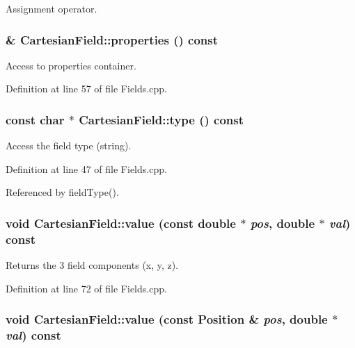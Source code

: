 Assignment operator. \hypertarget{class_d_d4hep_1_1_geometry_1_1_cartesian_field_ac6bf85a9043a7c08f84ce30afacc4b61}{
\subsubsection[{properties}]{ \& CartesianField::properties () const}}
\label{class_d_d4hep_1_1_geometry_1_1_cartesian_field_ac6bf85a9043a7c08f84ce30afacc4b61}


Access to properties container. 

Definition at line 57 of file Fields.cpp.\hypertarget{class_d_d4hep_1_1_geometry_1_1_cartesian_field_a9d06918823238356e8a1786391af78cc}{
\subsubsection[{type}]{\setlength{\rightskip}{0pt plus 5cm}const char $\ast$ CartesianField::type () const}}
\label{class_d_d4hep_1_1_geometry_1_1_cartesian_field_a9d06918823238356e8a1786391af78cc}


Access the field type (string). 

Definition at line 47 of file Fields.cpp.

Referenced by fieldType().\hypertarget{class_d_d4hep_1_1_geometry_1_1_cartesian_field_afb9f7d4d28e90f2e341e8272c718c604}{
\subsubsection[{value}]{\setlength{\rightskip}{0pt plus 5cm}void CartesianField::value (const double $\ast$ {\em pos}, \/  double $\ast$ {\em val}) const}}
\label{class_d_d4hep_1_1_geometry_1_1_cartesian_field_afb9f7d4d28e90f2e341e8272c718c604}


Returns the 3 field components (x, y, z). 

Definition at line 72 of file Fields.cpp.\hypertarget{class_d_d4hep_1_1_geometry_1_1_cartesian_field_a21a1a039c5a742fb3f62932059f7d1a7}{
\subsubsection[{value}]{\setlength{\rightskip}{0pt plus 5cm}void CartesianField::value (const {\bf Position} \& {\em pos}, \/  double $\ast$ {\em val}) const}}
\label{class_d_d4hep_1_1_geometry_1_1_cartesian_field_a21a1a039c5a742fb3f62932059f7d1a7}


